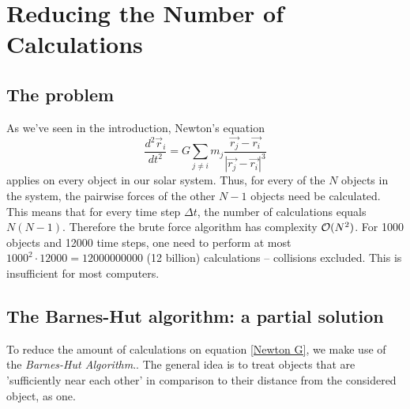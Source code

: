 \section{Reducing the Number of Calculations}
\subsection{The problem}
As we've seen in the introduction, Newton's equation
\begin{equation}
\frac{d^2\vec{r}_i}{dt^2}=G\sum_{j\neq i}m_j\frac{\vec{r_j}-\vec{r_i}}{|\vec{r_j}-\vec{r_i}|^3}
\label{Newton G}
\end{equation}
applies on every object in our solar system. 
Thus, for every of the $N$ objects in the system, the pairwise forces of the other $N-1$ objects need be calculated. 
This means that for every time step $\Delta t$, the number of calculations equals $N(N-1)$. 
Therefore the brute force algorithm has complexity $\mathcal{O}(N^2)$. 
For 1000 objects and 12000 time steps, one need to perform at most $1000^2\cdot 12000 = 12000000000$ (12 billion) calculations -- collisions excluded. 
This is insufficient for most computers.
\subsection{The Barnes-Hut algorithm: a partial solution}
To reduce the amount of calculations on equation \ref{Newton G}, we make use of the \textit{Barnes-Hut Algorithm}.\cite{barneshut}.
The general idea is to treat objects that are 'sufficiently near each other' in comparison to their distance from the considered object, as one.\\

